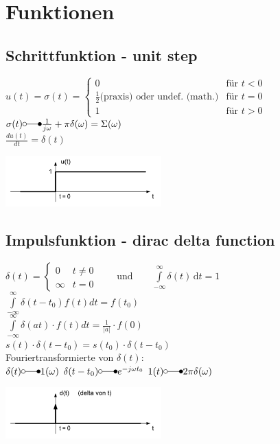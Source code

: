 

\section{Funktionen}
	\subsection{Schrittfunktion - unit step}
		\begin{minipage}{10cm}
			$u(t) = \sigma(t) =	\begin{cases}
						 0 & \text{f\"ur } t < 0 \\
						 \frac{1}{2} \text{(praxis)}  \text{ oder undef. (math.)} & \text{f\"ur } t = 0 \\
						 1 & \text{f\"ur } t > 0
					\end{cases}
			$
			$\sigma(t) \laplace \frac{1}{j\omega} + \pi\delta(\omega) = \Sigma(\omega)$ \\
			$\frac{du(t)}{dt}=\delta(t)$
		\end{minipage}
		\begin{minipage}{8cm}
			\includegraphics[width=6cm]{./bilder/unitstep.png}
		\end{minipage}

	\subsection{Impulsfunktion - dirac delta function}
		\begin{minipage}{10cm}
			$\delta (t)=\begin{cases} 0 & t\ne 0\\\infty & t=0\end{cases} \qquad
			\text{und} \qquad \int\limits_{-\infty}^\infty \delta(t) \, \mathrm dt = 1 $\\
			$\int\limits_{-\infty}^{\infty}\delta(t-t_0)f(t)dt=f(t_0)$\\
			$\int\limits_{-\infty}^{\infty}\delta(at)\cdot f(t) dt = \frac{1}{|a|} \cdot f(0)$\\
			$s(t) \cdot \delta(t-t_0) = s(t_0)\cdot \delta(t-t_0)$\\
			Fouriertransformierte von $\delta(t)$:\\
			$\delta(t) \laplace 1(\omega)$ \hspace{0.5cm}
			$\delta(t-t_0) \laplace e^{-j\omega t_0}$ \hspace{0.5cm}
			$1(t) \laplace 2\pi \delta(\omega)$
		\end{minipage}
		\begin{minipage}{8cm}
			\includegraphics[width=6cm]{./bilder/diracimpulse.png}
		\end{minipage}
		

